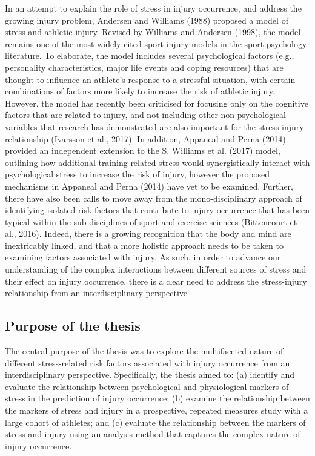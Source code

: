 \documentclass[man,floatsintext]{apa6}
\begin{document}
In an attempt to explain the role of stress in injury occurrence, and address the growing injury problem, Andersen and Williams (1988) proposed a model of stress and athletic injury.
Revised by Williams and Andersen (1998), the model remains one of the most widely cited sport injury models in the sport psychology literature.
To elaborate, the model includes several psychological factors (e.g., personality characteristics, major life events and coping resources) that are thought to influence an athlete's response to a stressful situation, with certain combinations of factors more likely to increase the risk of athletic injury.
However, the model has recently been criticised for focusing only on the cognitive factors that are related to injury, and not including other non-psychological variables that research has demonstrated are also important for the stress-injury relationship (Ivarsson et al., 2017).
In addition, Appaneal and Perna (2014) provided an independent extension to the S. Williams et al. (2017) model, outlining how additional training-related stress would synergistically interact with psychological stress to increase the risk of injury,
however the proposed mechanisms in Appaneal and Perna (2014) have yet to be examined.
Further, there have also been calls to move away from the mono-disciplinary approach of identifying isolated risk factors that contribute to injury occurrence that has been typical within the sub disciplines of sport and exercise sciences (Bittencourt et al., 2016).
Indeed, there is a growing recognition that the body and mind are inextricably linked, and that a more holistic approach needs to be taken to examining factors associated with injury.
As such, in order to advance our understanding of the complex interactions between different sources of stress and their effect on injury occurrence, there is a clear need to address the stress-injury relationship from an interdisciplinary perspective

\hypertarget{purpose-of-the-thesis}{%
\subsection{Purpose of the thesis}\label{purpose-of-the-thesis}}

The central purpose of the thesis was to explore the multifaceted nature of different stress-related risk factors associated with injury occurrence from an interdisciplinary perspective. Specifically, the thesis aimed to:
(a) identify and evaluate the relationship between psychological and physiological markers of stress in the prediction of injury occurrence;
(b) examine the relationship between the markers of stress and injury in a prospective, repeated measures study with a large cohort of athletes; and
(c) evaluate the relationship between the markers of stress and injury using an analysis method that captures the complex nature of injury occurrence.
\end{document}

